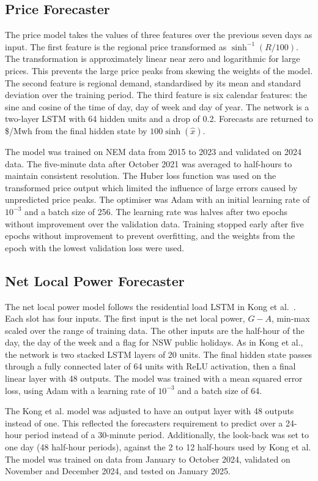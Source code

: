 \subsection{Price Forecaster}
The price model takes the values of three features over the previous seven days as input. The first feature is the regional price transformed as $\sinh^{-1}(R/100)$. The transformation is approximately linear near zero and logarithmic for large prices. This prevents the large price peaks from skewing the weights of the model. The second feature is regional demand, standardised by its mean and standard deviation over the training period. The third feature is six calendar features: the sine and cosine of the time of day, day of week and day of year. The network is a two-layer LSTM with 64 hidden units and a drop of 0.2. Forecasts are returned to \$/Mwh from the final hidden state by $100\sinh(\hat{x})$.

The model was trained on NEM data from 2015 to 2023 and validated on 2024 data. The five-minute data after October 2021 was averaged to half-hours to maintain consistent resolution. The Huber loss function was used on the transformed price output which limited the influence of large errors caused by unpredicted price peaks. The optimiser was Adam with an initial learning rate of $10^{-3}$ and a batch size of 256. The learning rate was halves after two epochs without improvement over the validation data. Training stopped early after five epochs without improvement to prevent overfitting, and the weights from the epoch with the lowest validation loss were used.

\subsection{Net Local Power Forecaster}
The net local power model follows the residential load LSTM in Kong et al.~\cite{kong2019lstm}. Each slot has four inputs. The first input is the net local power, $G-A$, min-max scaled over the range of training data. The other inputs are the half-hour of the day, the day of the week and a flag for NSW public holidays. As in Kong et al., the network is two stacked LSTM layers of 20 units. The final hidden state passes through a fully connected later of 64 units with ReLU activation, then a final linear layer with 48 outputs. The model was trained with a mean squared error loss, using Adam with a learning rate of $10^{-3}$ and a batch size of 64.

The Kong et al. model was adjusted to have an output layer with 48 outputs instead of one. This reflected the forecasters requirement to predict over a 24-hour period instead of a 30-minute period. Additionally, the look-back was set to one day (48 half-hour periods), against the 2 to 12 half-hours used by Kong et al. The model was trained on data from January to October 2024, validated on November and December 2024, and tested on January 2025.

